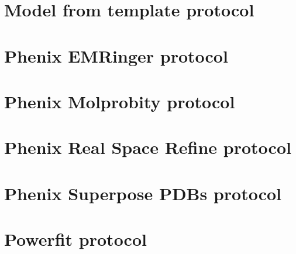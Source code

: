 \documentclass[12pt]{article} %
\begin{document}
\begin{appendices}
\begin{itemize}
\begin{itemize}
  
  \end{itemize}
  
  
 \end{itemize}


\section{Model from template protocol}
\label{app:modelFromTemplate}

\section{Phenix EMRinger protocol}
\label{app:emRingerProtocol}

\section{Phenix Molprobity protocol}
\label{app:molprobityProtocol}

\section{Phenix Real Space Refine protocol}
\label{app:realSpaceRefineProtocol}

\section{Phenix Superpose PDBs protocol}
\label{app:superposePdbsProtocol}

\section{Powerfit protocol}
\label{app:powerfitProtocol}








\end{appendices}
\end{document}
